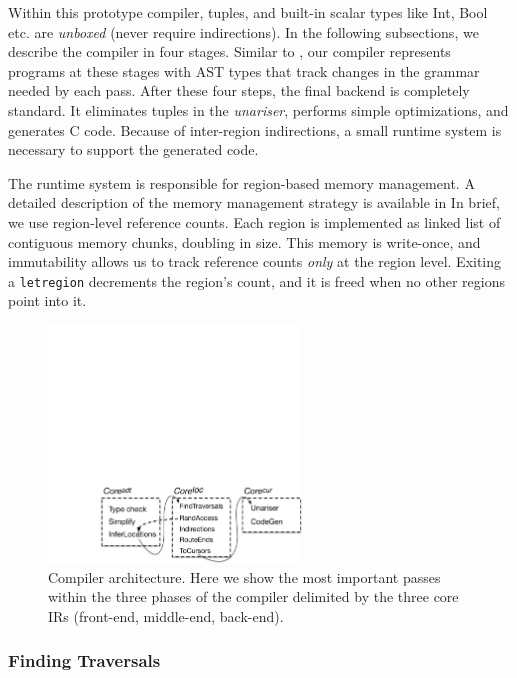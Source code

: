 \documentclass[showabstract,showacknowledgments,showpreface,showdedication]{iuphd}
\theoremstyle{nonumberplain}
\newcommand{\il}[1]{\lstinline[style=inline,mathescape=true];#1;}
\begin{document}
Within this prototype compiler, tuples, and built-in scalar types like Int, Bool
etc. are \emph{unboxed} (never require indirections).
%
In the following subsections, we describe the
compiler in four stages.
{Similar to \lamcur, our compiler represents
  programs at these stages with AST types that track changes in the
  grammar needed by each pass.
  After these four steps,}
  the final backend is completely standard.  It eliminates
tuples in the \emph{unariser},
performs simple optimizations, and generates C code.
%
Because of inter-region indirections, a small \ourcalc runtime system is
necessary to support the generated code.

The \ourcalc runtime system is responsible for region-based memory management. 
A detailed description of the memory management strategy is available in  %
In brief, we use region-level reference counts.  Each region is implemented as
linked list of contiguous memory chunks, doubling in size.  This memory is write-once,
and immutability allows us to track reference counts \emph{only} at the region
level.  Exiting a \il{letregion} decrements the region's count, and it is freed
when no other regions point into it.

\begin{figure}\center
  \includegraphics[width=0.6\textwidth]{compiler_arch}
  \caption{Compiler architecture.  Here we show the most important
    passes within the three phases of the compiler delimited by
    the three core IRs (front-end, middle-end, back-end).}
  \label{fig:compiler-arch}
\end{figure}

\subsubsection{Finding Traversals}
\label{sec:find-traversal}
\end{document}
